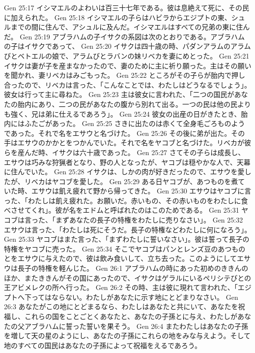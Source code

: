 Gen 25:17  イシマエルのよわいは百三十七年である。彼は息絶えて死に、その民に加えられた。
Gen 25:18  イシマエルの子らはハビラからエジプトの東、シュルまでの間に住んで、アシュルに及んだ。イシマエルはすべての兄弟の東に住んだ。
Gen 25:19  アブラハムの子イサクの系図は次のとおりである。アブラハムの子はイサクであって、
Gen 25:20  イサクは四十歳の時、パダンアラムのアラムびとベトエルの娘で、アラムびとラバンの妹リベカを妻にめとった。
Gen 25:21  イサクは妻が子を産まなかったので、妻のために主に祈り願った。主はその願いを聞かれ、妻リベカはみごもった。
Gen 25:22  ところがその子らが胎内で押し合ったので、リベカは言った、「こんなことでは、わたしはどうなるでしょう」。彼女は行って主に尋ねた。
Gen 25:23  主は彼女に言われた、「二つの国民があなたの胎内にあり、二つの民があなたの腹から別れて出る。一つの民は他の民よりも強く、兄は弟に仕えるであろう」。
Gen 25:24  彼女の出産の日がきたとき、胎内にはふたごがあった。
Gen 25:25  さきに出たのは赤くて全身毛ごろものようであった。それで名をエサウと名づけた。
Gen 25:26  その後に弟が出た。その手はエサウのかかとをつかんでいた。それで名をヤコブと名づけた。リベカが彼らを産んだ時、イサクは六十歳であった。
Gen 25:27  さてその子らは成長し、エサウは巧みな狩猟者となり、野の人となったが、ヤコブは穏やかな人で、天幕に住んでいた。
Gen 25:28  イサクは、しかの肉が好きだったので、エサウを愛したが、リベカはヤコブを愛した。
Gen 25:29  ある日ヤコブが、あつものを煮ていた時、エサウは飢え疲れて野から帰ってきた。
Gen 25:30  エサウはヤコブに言った、「わたしは飢え疲れた。お願いだ。赤いもの、その赤いものをわたしに食べさせてくれ」。彼が名をエドムと呼ばれたのはこのためである。
Gen 25:31  ヤコブは言った、「まずあなたの長子の特権をわたしに売りなさい」。
Gen 25:32  エサウは言った、「わたしは死にそうだ。長子の特権などわたしに何になろう」。
Gen 25:33  ヤコブはまた言った、「まずわたしに誓いなさい」。彼は誓って長子の特権をヤコブに売った。
Gen 25:34  そこでヤコブはパンとレンズ豆のあつものとをエサウに与えたので、彼は飲み食いして、立ち去った。このようにしてエサウは長子の特権を軽んじた。
Gen 26:1  アブラハムの時にあった初めのききんのほか、またききんがその国にあったので、イサクはゲラルにいるペリシテびとの王アビメレクの所へ行った。
Gen 26:2  その時、主は彼に現れて言われた、「エジプトへ下ってはならない。わたしがあなたに示す地にとどまりなさい。
Gen 26:3  あなたがこの地にとどまるなら、わたしはあなたと共にいて、あなたを祝福し、これらの国をことごとくあなたと、あなたの子孫とに与え、わたしがあなたの父アブラハムに誓った誓いを果そう。
Gen 26:4  またわたしはあなたの子孫を増して天の星のようにし、あなたの子孫にこれらの地をみな与えよう。そして地のすべての国民はあなたの子孫によって祝福をえるであろう。
